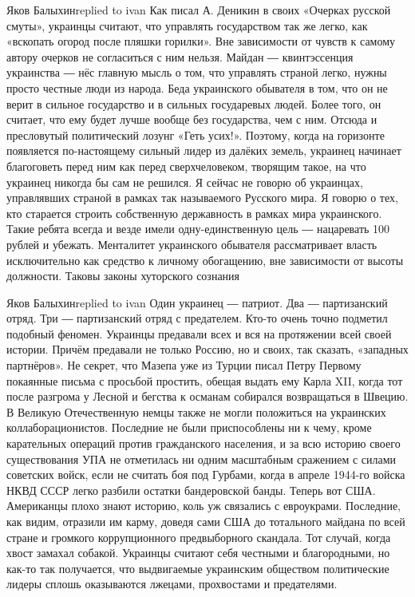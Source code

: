 Яков Балыхинreplied to ivan
Как писал А. Деникин в своих «Очерках русской смуты», украинцы считают, что управлять государством так же легко, как «вскопать огород после пляшки горилки». Вне зависимости от чувств к самому автору очерков не согласиться с ним нельзя. Майдан ― квинтэссенция украинства ― нёс главную мысль о том, что управлять страной легко, нужны просто честные люди из народа. Беда украинского обывателя в том, что он не верит в сильное государство и в сильных государевых людей. Более того, он считает, что ему будет лучше вообще без государства, чем с ним. Отсюда и пресловутый политический лозунг «Геть усих!». Поэтому, когда на горизонте появляется по-настоящему сильный лидер из далёких земель, украинец начинает благоговеть перед ним как перед сверхчеловеком, творящим такое, на что украинец никогда бы сам не решился. Я сейчас не говорю об украинцах, управлявших страной в рамках так называемого Русского мира. Я говорю о тех, кто старается строить собственную державность в рамках мира украинского. Такие ребята всегда и везде имели одну-единственную цель ― нацаревать 100 рублей и убежать. Менталитет украинского обывателя рассматривает власть исключительно как средство к личному обогащению, вне зависимости от высоты должности. Таковы законы хуторского сознания

Яков Балыхинreplied to ivan
Один украинец ― патриот. Два ― партизанский отряд. Три ― партизанский отряд с предателем. Кто-то очень точно подметил подобный феномен. Украинцы предавали всех и вся на протяжении всей своей истории. Причём предавали не только Россию, но и своих, так сказать, «западных партнёров». Не секрет, что Мазепа уже из Турции писал Петру Первому покаянные письма с просьбой простить, обещая выдать ему Карла XII, когда тот после разгрома у Лесной и бегства к османам собирался возвращаться в Швецию. В Великую Отечественную немцы также не могли положиться на украинских коллаборационистов. Последние не были приспособлены ни к чему, кроме карательных операций против гражданского населения, и за всю историю своего существования УПА не отметилась ни одним масштабным сражением с силами советских войск, если не считать боя под Гурбами, когда в апреле 1944-го войска НКВД СССР легко разбили остатки бандеровской банды. Теперь вот США. Американцы плохо знают историю, коль уж связались с евроукрами. Последние, как видим, отразили им карму, доведя сами США до тотального майдана по всей стране и громкого коррупционного предвыборного скандала. Тот случай, когда хвост замахал собакой. Украинцы считают себя честными и благородными, но как-то так получается, что выдвигаемые украинским обществом политические лидеры сплошь оказываются лжецами, прохвостами и предателями.

